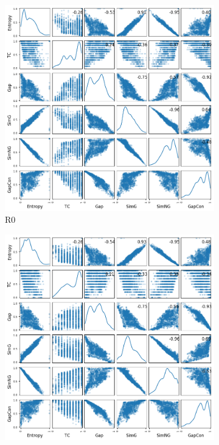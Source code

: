 \begin{figure}[!htbp]	
	\begin{adjustwidth}{-1cm}{-1cm}
		\centering
		\begin{subfigure}{0.35\textwidth}
			\includegraphics[width=\columnwidth]{Figure/6-obj-old/R0/fig/scatter_mattrix}
			\caption{R0}
		\end{subfigure}	
		\begin{subfigure}{0.35\textwidth}
			\includegraphics[width=\columnwidth]{Figure/6-obj-old/R4/fig/scatter_mattrix}

\end{subfigure}
\end{adjustwidth}
\end{figure}
